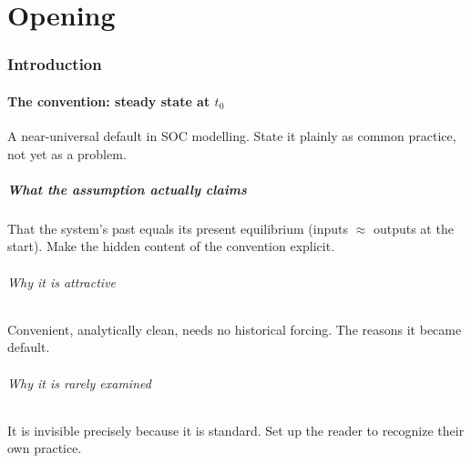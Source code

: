 \documentclass[11pt]{article}
\begin{document}
\tableofcontents

\part{Opening}

\section{Introduction}

\subsection{The convention: steady state at $t_0$}
A near-universal default in SOC modelling. State it plainly as common
practice, not yet as a problem.

\subsubsection{What the assumption actually claims}
That the system's past equals its present equilibrium (inputs $\approx$
outputs at the start). Make the hidden content of the convention explicit.

\paragraph{Why it is attractive}
Convenient, analytically clean, needs no historical forcing. The reasons it
became default.

\paragraph{Why it is rarely examined}
It is invisible precisely because it is standard. Set up the reader to
recognize their own practice.

\end{document}
